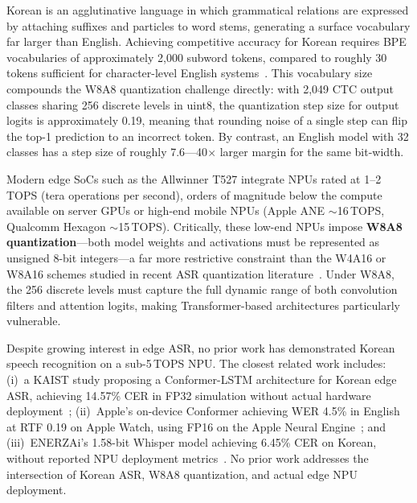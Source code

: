 \documentclass[a4paper,11pt,twocolumn]{article}
\begin{document}
Korean is an agglutinative language in which grammatical relations are expressed by attaching suffixes and particles to word stems, generating a surface vocabulary far larger than English. Achieving competitive accuracy for Korean requires BPE vocabularies of approximately 2,000 subword tokens, compared to roughly 30 tokens sufficient for character-level English systems~\cite{koo2021}. This vocabulary size compounds the W8A8 quantization challenge directly: with 2,049 CTC output classes sharing 256 discrete levels in uint8, the quantization step size for output logits is approximately 0.19, meaning that rounding noise of a single step can flip the top-1 prediction to an incorrect token. By contrast, an English model with 32 classes has a step size of roughly 7.6---40$\times$ larger margin for the same bit-width.

Modern edge SoCs such as the Allwinner T527 integrate NPUs rated at 1--2\,TOPS (tera operations per second), orders of magnitude below the compute available on server GPUs or high-end mobile NPUs (Apple ANE ${\sim}$16\,TOPS, Qualcomm Hexagon ${\sim}$15\,TOPS). Critically, these low-end NPUs impose \textbf{W8A8 quantization}---both model weights and activations must be represented as unsigned 8-bit integers---a far more restrictive constraint than the W4A16 or W8A16 schemes studied in recent ASR quantization literature~\cite{ding2022,li2023,chen2025}. Under W8A8, the 256 discrete levels must capture the full dynamic range of both convolution filters and attention logits, making Transformer-based architectures particularly vulnerable.

Despite growing interest in edge ASR, no prior work has demonstrated Korean speech recognition on a sub-5\,TOPS NPU. The closest related work includes: (i)~a KAIST study proposing a Conformer-LSTM architecture for Korean edge ASR, achieving 14.57\% CER in FP32 simulation without actual hardware deployment~\cite{wang2023}; (ii)~Apple's on-device Conformer achieving WER 4.5\% in English at RTF 0.19 on Apple Watch, using FP16 on the Apple Neural Engine~\cite{apple2024}; and (iii)~ENERZAi's 1.58-bit Whisper model achieving 6.45\% CER on Korean, without reported NPU deployment metrics~\cite{enerzai2025}. No prior work addresses the intersection of Korean ASR, W8A8 quantization, and actual edge NPU deployment.
\end{document}
